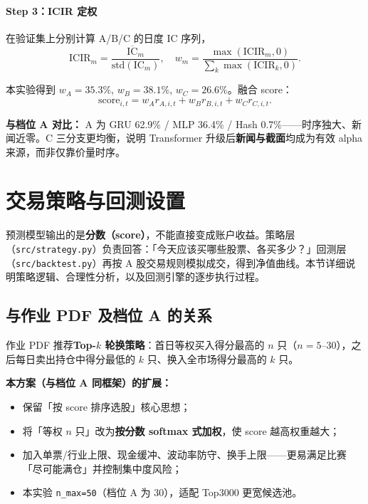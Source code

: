 \documentclass[UTF8,a4paper,12pt]{ctexart}
\begin{document}
\paragraph{Step 3：ICIR 定权}

在验证集上分别计算 A/B/C 的日度 IC 序列，
\begin{equation}
  \mathrm{ICIR}_m = \frac{\overline{\mathrm{IC}}_m}{\mathrm{std}(\mathrm{IC}_m)}, \quad
  w_m = \frac{\max(\mathrm{ICIR}_m, 0)}{\sum_k \max(\mathrm{ICIR}_k, 0)}.
\end{equation}

本实验得到 $w_A=35.3\%$, $w_B=38.1\%$, $w_C=26.6\%$。融合 score：
\begin{equation}
  \mathrm{score}_{i,t} = w_A r_{A,i,t} + w_B r_{B,i,t} + w_C r_{C,i,t}.
\end{equation}

\textbf{与档位 A 对比：} A 为 GRU 62.9\% / MLP 36.4\% / Hash 0.7\%——时序独大、新闻近零。C 三分支更均衡，说明 Transformer 升级后\textbf{新闻与截面}均成为有效 alpha 来源，而非仅靠价量时序。

\section{交易策略与回测设置}
\label{sec:strategy}

预测模型输出的是\textbf{分数（score）}，不能直接变成账户收益。策略层（\texttt{src/strategy.py}）负责回答：「今天应该买哪些股票、各买多少？」回测层（\texttt{src/backtest.py}）再按 A 股交易规则模拟成交，得到净值曲线。本节详细说明策略逻辑、合理性分析，以及回测引擎的逐步执行过程。

\subsection{与作业 PDF 及档位 A 的关系}

作业 PDF 推荐\textbf{Top-$k$ 轮换策略}：首日等权买入得分最高的 $n$ 只（$n=5\text{--}30$），之后每日卖出持仓中得分最低的 $k$ 只、换入全市场得分最高的 $k$ 只。

\textbf{本方案（与档位 A 同框架）的扩展：}
\begin{itemize}[leftmargin=2em]
  \item 保留「按 score 排序选股」核心思想；
  \item 将「等权 $n$ 只」改为\textbf{按分数 softmax 式加权}，使 score 越高权重越大；
  \item 加入单票/行业上限、现金缓冲、波动率防守、换手上限——更易满足比赛「尽可能满仓」并控制集中度风险；
  \item 本实验 \texttt{n\_max=50}（档位 A 为 30），适配 Top3000 更宽候选池。
\end{itemize}
\end{document}
